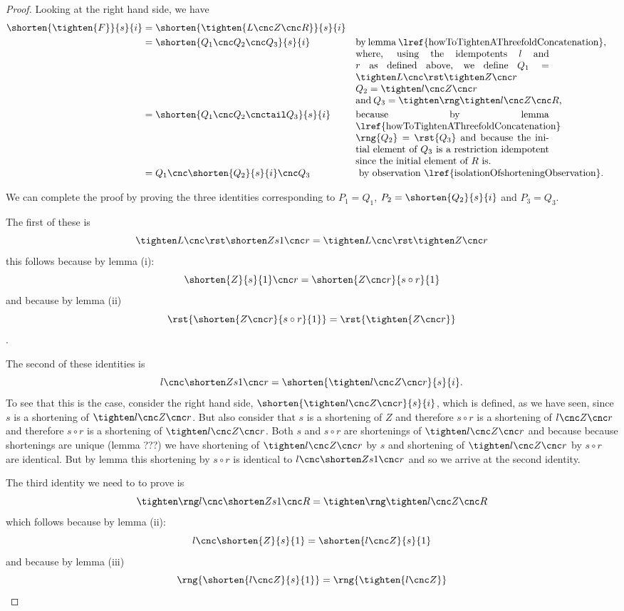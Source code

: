 \begin{proof}
Looking at the right hand side, we have 
\begin{align*}
\shorten{\tighten{F}}{s}{i}
   &= \shorten{\tighten{L \cnc Z \cnc R}}
                {s}{i} \\
   &= \shorten{Q_1 \cnc Q_2 \cnc Q_3}{s}{i} 
       && \mbox{\parbox[t]{7cm}
                {
                  by lemma 
                  \lref{howToTightenAThreefoldConcatenation},
                  where, using the idempotents $l$ and $r$
                   as defined above, we define
                   $Q_1= \rightPartOneOfThree$\\
                  $Q_2=\ZZ$\\
                  and $Q_3=\rightPartThreeOfThree$,
                }
                } \\
    &= \shorten{Q_1 \cnc Q_2 \cnctail Q_3}{s}{i} 
        && \mbox{\parbox[t]{7cm}
            {
              because  by lemma 
                  \lref{howToTightenAThreefoldConcatenation}
              $\rng{Q_2} = \rst{Q_3}$ and because 
              the initial element of $Q_3$ is a restriction
              idempotent since the initial element of $R$ is. 
            }
                }  \\
    &= Q_1 \cnc \shorten{Q_2}{s}{i} \cnc  Q_3
        && \mbox{
            by observation \lref{isolationOfshorteningObservation}.
                } 
\end{align*}

We can complete the proof by proving the three identities
corresponding to $P_1 = Q_1$,
$P_2=\shorten{Q_2}{s}{i}$ and $P_3=Q_3$.

The first of these is
\[
\leftPartOneOfThree = \rightPartOneOfThree 
\]
this follows because by lemma (i):
\[
\shorten{Z}{s}{1} \cnc r = \shorten{Z \cnc r}{s \circ r}{1} 
\]
and because by lemma (ii)
\[
\rst{\shorten{Z \cnc r}{s \circ r}{1}} =  \rst{\tighten{Z \cnc r}} 
\]
\workt{\raisebox{0.5cm}{$\Uparrow$}}.

The second of these identities is 
\[
\leftPartTwoOfThree  = \shorten{\ZZ}{s}{i}.
\]
To see that this is the case, consider the right hand side,
$\shorten{\ZZ}{s}{i}$, which is defined, as we have seen, 
since $s$ is a shortening of $\ZZ$. But also consider that
$s$ is a shortening of $Z$ and therefore 
$s \circ r$ is a shortening of $l \cnc Z \cnc r$ and therefore
$s \circ r$ is a shortening of $\ZZ$. 
Both $s$ and $s \circ r$ are shortenings of $\ZZ$ and because
because shortenings are unique (lemma ???) we have
shortening of $\ZZ$ by $s$ and shortening of $\ZZ$ by $s \circ r$ 
are identical. 
But by lemma  this shortening by 
$s \circ r$ is identical to $\leftPartTwoOfThree$ and so we arrive at
the second identity.

The third identity we need to to prove is
\[
\leftPartThreeOfThree = \rightPartThreeOfThree 
\]
which follows because by lemma (ii):
\[
l \cnc \shorten{Z}{s}{1} = \shorten{l \cnc  Z}{s}{1} 
\]
and because by lemma (iii)
\[
\rng{\shorten{l \cnc  Z}{s}{1}} =  \rng{\tighten{l \cnc  Z}} 
\]
\end{proof}

